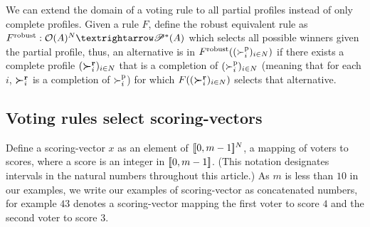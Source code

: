 \documentclass[version=last, pagesize, twoside=off, bibliography=totoc, DIV=calc, fontsize=14pt, a4paper, french, english]{scrartcl}
\begin{document}
We can extend the domain of a voting rule to all partial profiles instead of only complete profiles. Given a rule $F$, define the robust equivalent rule as $F^\text{robust}: \allpprofs → \powersetz{\alts}$ which selects all possible winners given the partial profile, thus, an alternative is in $F^\text{robust}((\succ_i^\text{p})_{i \in N})$ if there exists a complete profile $(\boldsymbol{\succ}^\textbf{r}_i)_{i \in N}$ that is a completion of $(\succ_i^\text{p})_{i \in N}$ (meaning that for each $i$, $\boldsymbol{\succ}^\textbf{r}_i$ is a completion of $\succ^\text{p}_i$) for which $F((\boldsymbol{\succ}^\textbf{r}_i)_{i \in N})$ selects that alternative.

\subsection{Voting rules select scoring-vectors}
Define a scoring-vector $x$ as an element of $\lbrack\!\lbrack{}0, m-1\rbrack\!\rbrack^N$, a mapping of voters to scores, where a score is an integer in $\lbrack\!\lbrack{}0, m-1\rbrack\!\rbrack$. (This notation designates intervals in the natural numbers throughout this article.) As $m$ is less than $10$ in our examples, we write our examples of scoring-vector as concatenated numbers, for example $43$ denotes a scoring-vector mapping the first voter to score $4$ and the second voter to score $3$.
\end{document}
